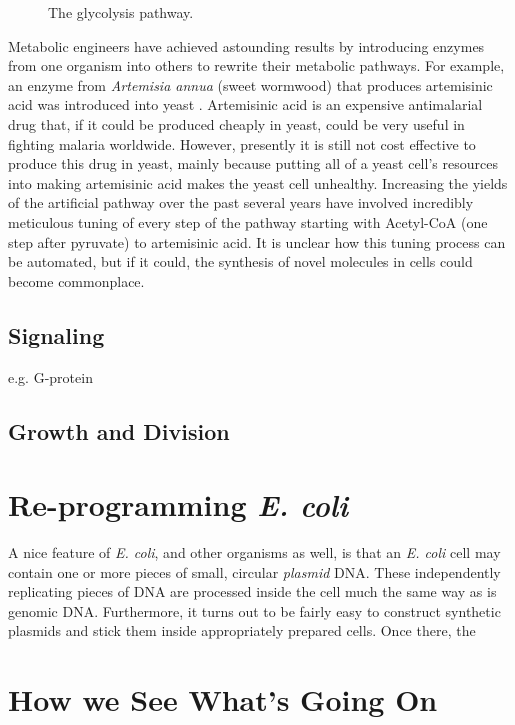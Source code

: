 \begin{figure}
\centering
{}
\caption{\label{fig:glycolysis}
  The glycolysis pathway. }
\end{figure}

Metabolic engineers have achieved astounding results by introducing
enzymes from one organism into others to rewrite their metabolic
pathways. For example, an enzyme from {\em Artemisia annua} (sweet
wormwood) that produces artemisinic acid was introduced into yeast
\cite{keasling-art}. Artemisinic acid is an expensive antimalarial
drug that, if it could be produced cheaply in yeast, could be very
useful in fighting malaria worldwide. However, presently it is still
not cost effective to produce this drug in yeast, mainly because
putting all of a yeast cell's resources into making artemisinic acid
makes the yeast cell unhealthy. Increasing the yields of the
artificial pathway over the past several years have involved
incredibly meticulous tuning of every step of the pathway starting
with Acetyl-CoA (one step after pyruvate) to artemisinic acid. It is
unclear how this tuning process can be automated, but if it could, the
synthesis of novel molecules in cells could become commonplace. 

\subsection{Signaling}

e.g. G-protein

\subsection{Growth and Division}

\section{Re-programming {\em E. coli}}


A nice feature of {\em E. coli}, and other organisms as well, is that
an {\em E. coli} cell may contain one or more pieces of small,
circular {\em plasmid} DNA. These independently replicating pieces of
DNA are processed inside the cell much the same way as is genomic
DNA. Furthermore, it turns out to be fairly easy to construct
synthetic plasmids and stick them inside appropriately prepared
cells. Once there, the 

\section{How we See What's Going On}

